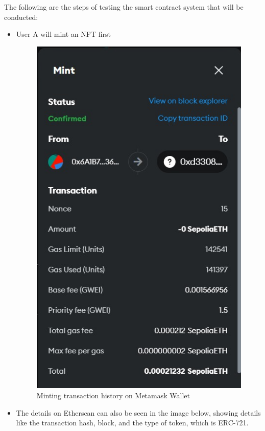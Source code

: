 The following are the steps of testing the smart contract system that will be conducted:

\begin{itemize}
    \item User A will mint an NFT first

    \begin{figure} [H] \centering
    \includegraphics[scale=0.23]{gambar/riwayat_transaksi.jpeg}
    \caption{Minting transaction history on Metamask Wallet}
    \label{fig:minting}
    \end{figure}

    \item The details on Etherscan can also be seen in the image below, showing details like the transaction hash, block, and the type of token, which is ERC-721.


\end{itemize}
